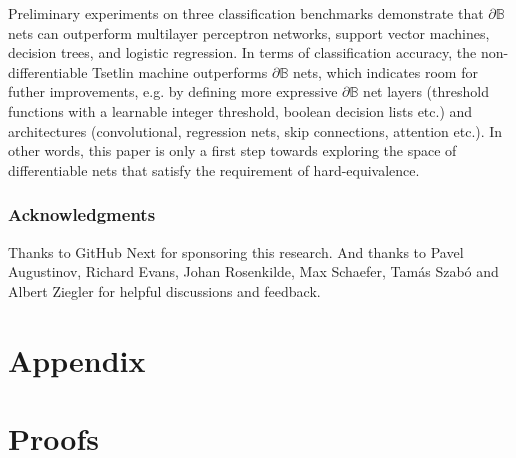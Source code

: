 \documentclass{article} %
\begin{document}
Preliminary experiments on three classification benchmarks demonstrate that $\partial\mathbb{B}$ nets can outperform multilayer perceptron networks, support vector machines, decision trees, and logistic regression. In terms of classification accuracy, the non-differentiable Tsetlin machine outperforms $\partial\mathbb{B}$ nets, which indicates room for futher improvements, e.g. by defining more expressive $\partial\mathbb{B}$ net layers (threshold functions with a learnable integer threshold, boolean decision lists etc.) and architectures (convolutional, regression nets, skip connections, attention etc.). In other words, this paper is only a first step towards exploring the space of differentiable nets that satisfy the requirement of hard-equivalence.


\subsubsection*{Acknowledgments}
Thanks to GitHub Next for sponsoring this research. And thanks to Pavel Augustinov, Richard Evans, Johan Rosenkilde, Max Schaefer, Tam\'{a}s Szab\'{o} and Albert Ziegler for helpful discussions and feedback.




\appendix

\section*{Appendix}

\section{Proofs}
\end{document}
